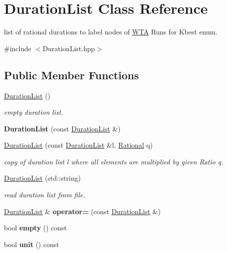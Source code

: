 \hypertarget{classDurationList}{}\section{Duration\+List Class Reference}
\label{classDurationList}


list of rational durations to label nodes of \mbox{\hyperlink{classWTA}{W\+TA}} Runs for Kbest enum.  




{\ttfamily \#include $<$Duration\+List.\+hpp$>$}

\subsection*{Public Member Functions}
\begin{DoxyCompactItemize}
\item 
\mbox{\hyperlink{group__output_ga24f753a9aa9316fc7903e6f253b94944}{Duration\+List}} ()
\begin{DoxyCompactList}\small\item\em empty duration list. \end{DoxyCompactList}\item 
{\bfseries Duration\+List} (const \mbox{\hyperlink{classDurationList}{Duration\+List}} \&)
\item 
\mbox{\hyperlink{group__output_ga95ba6b1b14592003fdc97b69f982677c}{Duration\+List}} (const \mbox{\hyperlink{classDurationList}{Duration\+List}} \&l, \mbox{\hyperlink{classRational}{Rational}} q)
\begin{DoxyCompactList}\small\item\em copy of duration list l where all elements are multiplied by given Ratio q. \end{DoxyCompactList}\item 
\mbox{\hyperlink{group__output_gab678d41f41605596499c3f17a5f39120}{Duration\+List}} (std\+::string)
\begin{DoxyCompactList}\small\item\em read duration list from file. \end{DoxyCompactList}\item 
\mbox{\hyperlink{classDurationList}{Duration\+List}} \& {\bfseries operator=} (const \mbox{\hyperlink{classDurationList}{Duration\+List}} \&)
\item 
bool {\bfseries empty} () const
\item 
bool {\bfseries unit} () const
\item 
\mbox{\label{classDurationList_ac3b9ad9eadfa60cf0c72d05afc399226}} 

\end{DoxyCompactItemize}
